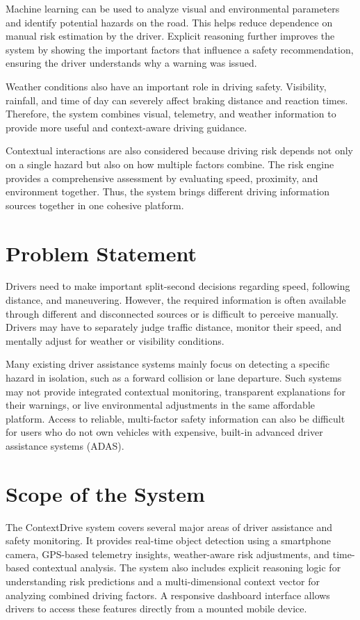 Machine learning can be used to analyze visual and environmental parameters and identify potential hazards on the road. This helps reduce dependence on manual risk estimation by the driver. Explicit reasoning further improves the system by showing the important factors that influence a safety recommendation, ensuring the driver understands why a warning was issued.

Weather conditions also have an important role in driving safety. Visibility, rainfall, and time of day can severely affect braking distance and reaction times. Therefore, the system combines visual, telemetry, and weather information to provide more useful and context-aware driving guidance.

Contextual interactions are also considered because driving risk depends not only on a single hazard but also on how multiple factors combine. The risk engine provides a comprehensive assessment by evaluating speed, proximity, and environment together. Thus, the system brings different driving information sources together in one cohesive platform.

\section{Problem Statement}

Drivers need to make important split-second decisions regarding speed, following distance, and maneuvering. However, the required information is often available through different and disconnected sources or is difficult to perceive manually. Drivers may have to separately judge traffic distance, monitor their speed, and mentally adjust for weather or visibility conditions.

Many existing driver assistance systems mainly focus on detecting a specific hazard in isolation, such as a forward collision or lane departure. Such systems may not provide integrated contextual monitoring, transparent explanations for their warnings, or live environmental adjustments in the same affordable platform. Access to reliable, multi-factor safety information can also be difficult for users who do not own vehicles with expensive, built-in advanced driver assistance systems (ADAS).

\section{Scope of the System}

The ContextDrive system covers several major areas of driver assistance and safety monitoring. It provides real-time object detection using a smartphone camera, GPS-based telemetry insights, weather-aware risk adjustments, and time-based contextual analysis. The system also includes explicit reasoning logic for understanding risk predictions and a multi-dimensional context vector for analyzing combined driving factors. A responsive dashboard interface allows drivers to access these features directly from a mounted mobile device.


